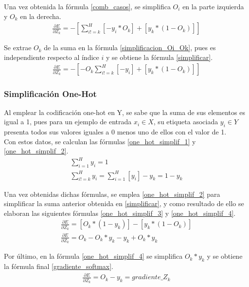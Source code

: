 Una vez obtenida la fórmula \ref{comb_casos}, se simplifica $O_i$ en la parte izquierda y $O_k$ en la derecha. \\
\begin{gather}
	\frac{\partial E}{\partial Z_k} = - [\sum_{i!=k}^{H} [- y_i * O_k] + [y_k * (1 - O_k) ] ] 
	\label{simplificacion_Oi_Ok}
\end{gather}

Se extrae $O_k$ de la suma en la fórmula \ref{simplificacion_Oi_Ok}, pues es independiente respecto al índice $i$ y se obtiene la fórmula \ref{simplificar}.\\
\begin{gather}	
	\frac{\partial E}{\partial Z_k} = - [-O_k \sum_{i!=k}^{H}[-y_i] + [y_k * (1 - O_k) ] ]
	\label{simplificar}
\end{gather}

\subsubsection{Simplificación One-Hot}

Al emplear la codificación one-hot en Y, se sabe que la suma de sus elementos es igual a 1, pues para un ejemplo de entrada $x_i \in X$, su etiqueta asociada $y_i \in Y$ presenta todos sus valores iguales a 0 menos uno de ellos con el valor de 1. \\
Con estos datos, se calculan las fórmulas \ref{one_hot_simplif_1} y \ref{one_hot_simplif_2}.
\begin{gather}
	\sum_{i=1}^{H} y_i = 1 \label{one_hot_simplif_1}\\
	\sum_{i!=k}^{H} y_i = \sum_{i=1}^{H} [y_i] - y_k = 1 - y_k
	\label{one_hot_simplif_2}
\end{gather}

Una vez obtenidas dichas fórmulas, se emplea \ref{one_hot_simplif_2} para simplificar la suma anterior obtenida en \ref{simplificar}, y como resultado de ello se elaboran las siguientes fórmulas \ref{one_hot_simplif_3} y \ref{one_hot_simplif_4}. \\


\begin{gather}
	\frac{\partial E}{\partial Z_k} = [O_k*(1-y_k)] - [y_k*(1-O_k)] \label{one_hot_simplif_3} \\
	\frac{\partial E}{\partial Z_k} = O_k - O_k * y_k - y_k + O_k * y_k  \label{one_hot_simplif_4}
\end{gather}

Por último, en la fórmula \ref{one_hot_simplif_4} se simplifica $O_k*y_k$ y se obtiene la fórmula final \ref{gradiente_softmax}. \\
\begin{gather}
	\frac{\partial E}{\partial Z_k} = O_k - y_k = gradiente\_Z_k
	\label{gradiente_softmax}
\end{gather}

